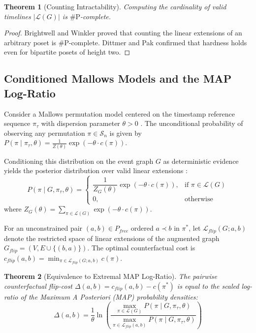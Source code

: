 \documentclass[journal]{IEEEtran}
\newtheorem{theorem}{Theorem}
\begin{document}
\begin{theorem}[Counting Intractability]
Computing the cardinality of valid timelines $|\mathcal{L}(G)|$ is $\#\text{P}$-complete.
\end{theorem}

\begin{proof}
Brightwell and Winkler \cite{Brightwell1991} proved that counting the linear extensions of an arbitrary poset is $\#\text{P}$-complete. Dittmer and Pak \cite{Dittmer2020} confirmed that hardness holds even for bipartite posets of height two.
\end{proof}

\subsection{Conditioned Mallows Models and the MAP Log-Ratio}
Consider a Mallows permutation model centered on the timestamp reference sequence $\pi_\tau$ with dispersion parameter $\theta > 0$ \cite{Mallows1957}. The unconditional probability of observing any permutation $\pi \in \mathcal{S}_n$ is given by $P(\pi \mid \pi_\tau, \theta) = \frac{1}{Z(\theta)} \exp(-\theta \cdot c(\pi))$.

Conditioning this distribution on the event graph $G$ as deterministic evidence yields the posterior distribution over valid linear extensions \cite{Lu2011}:
\begin{equation}
P(\pi \mid G, \pi_\tau, \theta) = \begin{cases} \dfrac{1}{Z_G(\theta)} \exp(-\theta \cdot c(\pi)), & \text{if } \pi \in \mathcal{L}(G) \\ 0, & \text{otherwise} \end{cases}
\end{equation}
where $Z_G(\theta) = \sum_{\pi \in \mathcal{L}(G)} \exp(-\theta \cdot c(\pi))$.

For an unconstrained pair $(a, b) \in P_{free}$ ordered $a \prec b$ in $\pi^*$, let $\mathcal{L}_{flip}(G; a, b)$ denote the restricted space of linear extensions of the augmented graph $G_{flip} = (V, E \cup \{(b, a)\})$. The optimal counterfactual cost is $c_{flip}(a, b) = \min_{\pi \in \mathcal{L}_{flip}(G; a, b)} c(\pi)$.

\begin{theorem}[Equivalence to Extremal MAP Log-Ratio]
The pairwise counterfactual flip-cost $\Delta(a, b) = c_{flip}(a, b) - c(\pi^*)$ is equal to the scaled log-ratio of the Maximum A Posteriori (MAP) probability densities:
\begin{equation}
\Delta(a, b) = \frac{1}{\theta} \ln \left( \frac{\max_{\pi \in \mathcal{L}(G)} P(\pi \mid G, \pi_\tau, \theta)}{\max_{\pi \in \mathcal{L}_{flip}(a, b)} P(\pi \mid G, \pi_\tau, \theta)} \right)
\end{equation}
\end{theorem}
\end{document}
